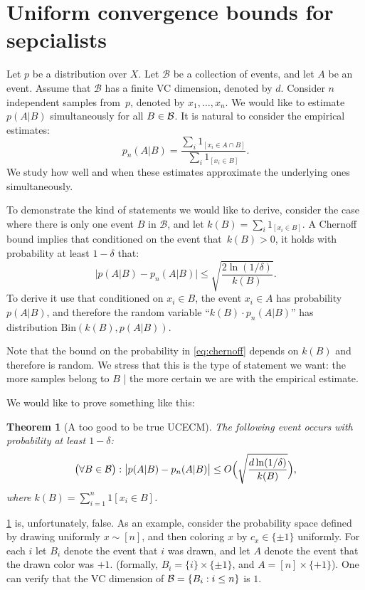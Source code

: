 \documentclass{article}
\newtheorem{theorem}{Theorem}[section]
\newcommand{\B}{{\cal B}}
\newcommand{\cB}{\mathcal{B}}
\newcommand{\comment}[3]{\marginpar{\textcolor{#2}{#1: #3}}}
\newcommand{\yoav}[1]{\comment{Yoav}{blue}{#1}}
\begin{document}
\section{Uniform convergence bounds for sepcialists}
\label{sec:convergence-bounds}

\yoav{I think that stating using the general term $A$ is an event,
  rather than the more problem specific $y=+1$ is confusing. I like
  the discussion but I would like to shorten it and not use ``too good
  to be true'' non-theorems.}

Let $p$ be a distribution over $X$.
Let $\cB$ be a collection of events, and let $A$ be an event.
Assume that $\cB$ has a finite VC dimension, denoted by $d$.
Consider $n$ independent samples from~$p$, denoted by $x_1,\ldots,x_n$.
We would like to estimate $p(A \vert B)$ simultaneously for all $B\in \B$.
It is natural to consider the empirical estimates:
\[p_n(A\vert B)=\frac{\sum_i 1_{[x_i\in A \cap B]}}{\sum_i 1_{[x_i\in B]}}.\]
We study how well and when these estimates approximate the underlying ones simultaneously.

To demonstrate the kind of statements we would like to derive,
consider the case where there is only one event $B$ in $\cB$, 
and let $k(B)=\sum_i 1_{[x_i\in B]}$.
A Chernoff bound implies that conditioned on the event that~$k(B)>0$, 
it holds with probability at least $1-\delta$ that:
\begin{equation}\label{eq:chernoff}
\bigl\lvert p(A\vert B) - p_n(A \vert B) \bigr\rvert \leq \sqrt{\frac{2\ln(1/\delta)}{k(B)}}.
\end{equation}
To derive it use that conditioned on $x_i\in B$, the event $x_i\in A$ has probability $p(A\vert B)$, 
and therefore the random variable ``$k(B)\cdot p_n(A \vert B)$'' has distribution $\mbox{Bin}(k(B), p(A\vert B))$.

Note that the bound on the probability in \ref{eq:chernoff} depends on $k(B)$
and therefore is random.
We stress that this is the type of statement we want:
the more samples belong to $B$ | the more certain we are with the empirical estimate.

We would like to prove something like this:
\begin{theorem}[A too good to be true UCECM]\label{thm:toogood}
The following event occurs with probability at least $1-\delta$:
\[\bigl(\forall B\in\B\bigr):\bigl\lvert p(A \vert B) - p_n(A \vert B) \bigr\rvert \leq O\Bigl(\sqrt{\frac{d\ln(1/\delta)}{k(B)}}\Bigr),\]
where $k(B) = \sum_{i=1}^n 1[x_i\in B]$.
\end{theorem}
\ref{thm:toogood} is, unfortunately, false. 
As an example, consider the probability space defined by drawing uniformly $x\sim[n]$,
and then coloring $x$ by $c_x\in\{\pm 1\}$ uniformly.
For each $i$ let $B_i$ denote the event that $i$ was drawn,
and let $A$ denote the event that the drawn color was  $+1$.
(formally, $B_i = \{i\}\times\{\pm 1\}$, and $A=[n]\times\{+1\}$).
One can verify that the VC dimension of $\B=\{B_i : i\leq n\}$ is $1$.
\end{document}
